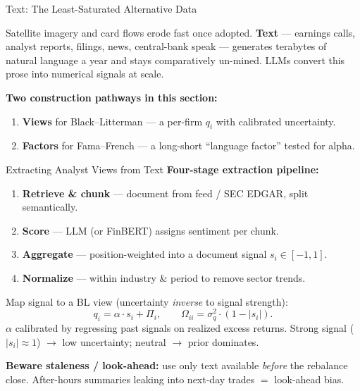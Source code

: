 \documentclass[9pt,t]{beamer}
\begin{document}
\begin{frame}{Text: The Least-Saturated Alternative Data}
\begin{bigpicture}
Satellite imagery and card flows erode fast once adopted. \textbf{Text} ---
earnings calls, analyst reports, filings, news, central-bank speak --- generates
terabytes of natural language a year and stays comparatively un-mined.
LLMs convert this prose into numerical signals at scale.
\end{bigpicture}

\medskip
\textbf{Two construction pathways in this section:}
\begin{enumerate}
  \item \textbf{Views} for Black--Litterman --- a per-firm $q_i$ with calibrated uncertainty.
  \item \textbf{Factors} for Fama--French --- a long-short ``language factor'' tested for alpha.
\end{enumerate}
\end{frame}

\begin{frame}{Extracting Analyst Views from Text}
\textbf{Four-stage extraction pipeline:}
\begin{enumerate}
  \item \textbf{Retrieve \& chunk} --- document from feed / SEC EDGAR, split semantically.
  \item \textbf{Score} --- LLM (or FinBERT) assigns sentiment per chunk.
  \item \textbf{Aggregate} --- position-weighted into a document signal $s_i\in[-1,1]$.
  \item \textbf{Normalize} --- within industry \& period to remove sector trends.
\end{enumerate}

\begin{underhood}
Map signal to a BL view (uncertainty \emph{inverse} to signal strength):
\[
q_i=\alpha\cdot s_i+\Pi_i,\qquad \Omega_{ii}=\sigma_q^2\cdot(1-|s_i|).
\]
$\alpha$ calibrated by regressing past signals on realized excess returns.
Strong signal ($|s_i|\!\approx\!1$) $\to$ low uncertainty; neutral $\to$ prior dominates.
\end{underhood}

\medskip
\textbf{Beware staleness / look-ahead:} use only text available \emph{before} the
rebalance close. After-hours summaries leaking into next-day trades $=$ look-ahead bias.
\end{frame}
\end{document}
